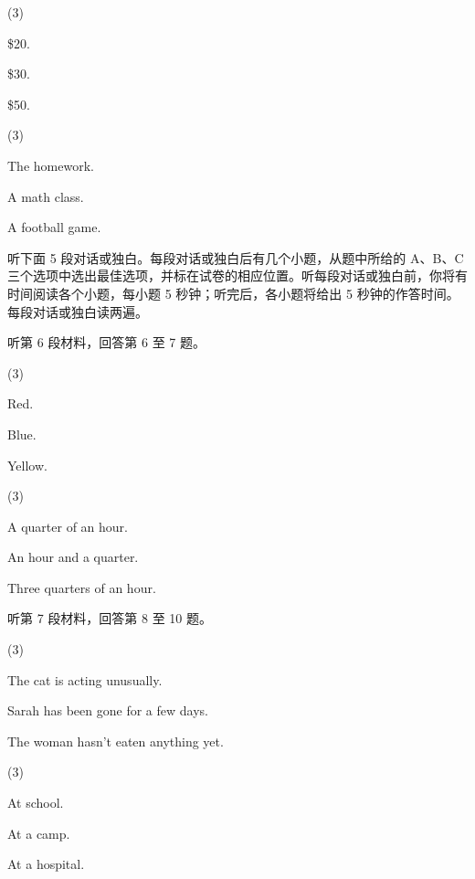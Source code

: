 \documentclass{英语试卷}
\begin{document}
\begin{choices}(3)
  \item \$20.
  \item \$30.
  \item \$50.
\end{choices}
\begin{choices}(3)
  \item The homework.
  \item A math class.
  \item A football game.
\end{choices}
\par 听下面 5 段对话或独白。每段对话或独白后有几个小题，从题中所给的 A、B、C 三个选项中选出最佳选项，并标在试卷的相应位置。听每段对话或独白前，你将有时间阅读各个小题，每小题 5 秒钟；听完后，各小题将给出 5 秒钟的作答时间。每段对话或独白读两遍。\par
\par 听第 6 段材料，回答第 6 至 7 题。\par
{}
\begin{choices}(3)
  \item Red.
  \item Blue.
  \item Yellow.
\end{choices}
\begin{choices}(3)
  \item A quarter of an hour.
  \item An hour and a quarter.
  \item Three quarters of an hour.
\end{choices}
\par 听第 7 段材料，回答第 8 至 10 题。\par
{}
\begin{choices}(3)
  \item The cat is acting unusually.
  \item Sarah has been gone for a few days.
  \item The woman hasn't eaten anything yet.
\end{choices}
\begin{choices}(3)
  \item At school.
  \item At a camp.
  \item At a hospital.
\end{choices}
\end{document}
